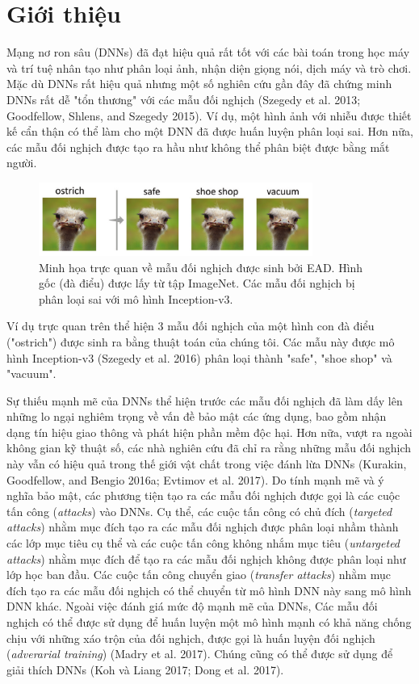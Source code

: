 \chapter{Giới thiệu}
Mạng nơ ron sâu (DNNs) đã đạt hiệu quả rất tốt với các bài toán trong học máy
và trí tuệ nhân tạo như phân loại ảnh, nhận diện giọng nói, dịch máy và trò chơi.
Mặc dù DNNs rất hiệu quả nhưng một số nghiên cứu gần đây đã chứng minh DNNs rất 
dễ  "tổn thương" với các mẫu đối nghịch (Szegedy et al. 2013; Goodfellow, Shlens, 
and Szegedy 2015). Ví dụ, một hình ảnh với nhiễu được thiết kế cẩn thận có thể
làm cho một DNN đã được huấn luyện phân loại sai. Hơn nữa, các mẫu đối nghịch
được tạo ra hầu như không thể phân biệt được bằng mắt người. 
\begin{figure}[H] %
    \centering %
    \includegraphics[width=0.8\textwidth]{assets/fig_01.png} 
    \caption{Minh họa trực quan về mẫu đối nghịch được sinh bởi EAD. 
    Hình gốc (đà điểu) được lấy từ tập ImageNet. Các mẫu đối nghịch bị 
    phân loại sai với mô hình Inception-v3.} %
    \label{fig:fg_01}
\end{figure}
Ví dụ trực quan trên thể hiện 3 mẫu đối nghịch của một hình con đà điểu ("ostrich") 
được sinh ra bằng thuật toán của chúng tôi. Các mẫu này được mô hình Inception-v3 
(Szegedy et al. 2016) phân loại thành "safe", "shoe shop" và "vacuum". 

Sự thiếu mạnh mẽ của DNNs thể hiện trước các mẫu đối nghịch đã làm dấy lên những lo ngại 
nghiêm trọng về vấn đề bảo mật các ứng dụng, bao gồm nhận dạng tín hiệu giao thông 
và phát hiện phần mềm độc hại. Hơn nữa, vượt ra ngoài không gian kỹ thuật số, 
các nhà nghiên cứu đã chỉ ra rằng những mẫu đối nghịch này vẫn có hiệu quả trong thế giới 
vật chất trong việc đánh lừa DNNs (Kurakin, Goodfellow, and Bengio 2016a; Evtimov et al. 2017).
Do tính mạnh mẽ và ý nghĩa bảo mật, các phương tiện tạo ra các mẫu đối nghịch được gọi là 
các cuộc tấn công (\textit{attacks}) vào DNNs. Cụ thể, các cuộc tấn công có chủ đích 
(\textit{targeted attacks}) nhằm mục đích tạo ra các mẫu đối nghịch được phân loại nhầm thành các lớp mục tiêu 
cụ thể và các cuộc tấn công không nhắm mục tiêu (\textit{untargeted attacks}) nhằm mục đích 
để tạo ra các mẫu đối nghịch không được phân loại như lớp học ban đầu. Các cuộc tấn công 
chuyển giao (\textit{transfer attacks}) nhằm mục đích tạo ra các mẫu đối nghịch có thể chuyển 
từ mô hình DNN này sang mô hình DNN khác. Ngoài việc đánh giá mức độ mạnh mẽ của DNNs,
Các mẫu đối nghịch có thể được sử dụng để huấn luyện một mô hình mạnh có khả năng chống chịu 
với những xáo trộn của đối nghịch, được gọi là huấn luyện đối nghịch (\textit{adverarial training}) 
(Madry et al. 2017). Chúng cũng có thể được sử dụng để giải thích DNNs (Koh và Liang 2017;
Dong et al. 2017). 

